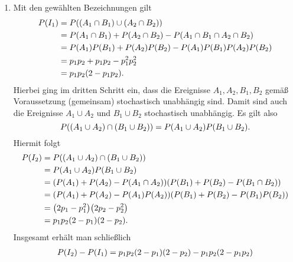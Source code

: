 \documentclass{exercise}
\begin{document}
    \begin{enumerate}
        \item Mit den gewählten Bezeichnungen gilt
        \begin{align*}
            P\parentheses*{I_1} &= P\parentheses*{\parentheses*{A_1 \cap B_1} \cup \parentheses*{A_2 \cap B_2}}\\
            &= P\parentheses*{A_1 \cap B_1} + P\parentheses*{A_2 \cap B_2} - P\parentheses*{A_1 \cap B_1 \cap A_2 \cap B_2}\\
            &= P\parentheses*{A_1}P\parentheses*{B_1} + P\parentheses*{A_2}P\parentheses*{B_2} - P\parentheses*{A_1}P\parentheses*{B_1}P\parentheses*{A_2}P\parentheses*{B_2}\\
            &= p_1 p_2 + p_1 p_2 - p_1^2 p_2^2\\
            &= p_1 p_2\parentheses*{2 - p_1 p_2}.
        \end{align*}
        Hierbei ging im dritten Schritt ein, dass die Ereignisse \(A_1, A_2, B_1, B_2\) gemäß Voraussetzung (gemeinsam) stochastisch unabhängig sind.
        Damit sind auch die Ereignisse \(A_1 \cup A_2\) und \(B_1 \cup B_2\) stochastisch unabhängig.
        Es gilt also
        \[
            P\parentheses*{\parentheses*{A_1 \cup A_2} \cap \parentheses*{B_1 \cup B_2}} = P\parentheses*{A_1 \cup A_2}P\parentheses*{B_1 \cup B_2}.
        \]
        Hiermit folgt
        \begin{align*}
            P\parentheses*{I_2} &= P\parentheses*{\parentheses*{A_1 \cup A_2} \cap \parentheses*{B_1 \cup B_2}}\\
            &= P\parentheses*{A_1 \cup A_2}P\parentheses*{B_1 \cup B_2}\\
            &= \parentheses*{P\parentheses*{A_1} + P\parentheses*{A_2} - P\parentheses*{A_1 \cap A_2}}\parentheses*{P\parentheses*{B_1} + P\parentheses*{B_2} - P\parentheses*{B_1 \cap B_2}}\\
            &= \parentheses*{P\parentheses*{A_1} + P\parentheses*{A_2} - P\parentheses*{A_1}P\parentheses*{A_2}}\parentheses*{P\parentheses*{B_1} + P\parentheses*{B_2} - P\parentheses*{B_1}P\parentheses*{B_2}}\\
            &= \parentheses*{2p_1 - p_1^2}\parentheses*{2p_2 - p_2^2}\\
            &= p_1 p_2\parentheses*{2 - p_1}\parentheses*{2 - p_2}.
        \end{align*}
        Insgesamt erhält man schließlich
        \begin{align*}
            P\parentheses*{I_2} - P\parentheses*{I_1} &= p_1 p_2\parentheses*{2 - p_1}\parentheses*{2 - p_2} - p_1 p_2\parentheses*{2 - p_1 p_2}\\

\end{align*}
\end{enumerate}
\end{document}
